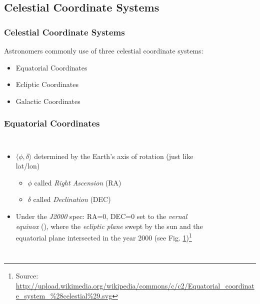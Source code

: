 \subsection{Celestial Coordinate Systems}
\begin{frame}
\frametitle{Celestial Coordinate Systems}
Astronomers commonly use of \alert{three} celestial coordinate systems:
\begin{itemize}
\item Equatorial Coordinates
\item Ecliptic Coordinates
\item Galactic Coordinates
\end{itemize}
\end{frame}
\begin{frame}
\frametitle{Equatorial Coordinates}
\begin{columns}[c]
\begin{itemize}
\item $\langle\phi,\delta\rangle$ determined by the Earth's axis of rotation (just like lat/lon)
	\begin{itemize}
	\item $\phi$ called \emph{Right Ascension} (RA)
	\item $\delta$ called \emph{Declination} (DEC)
	\end{itemize}
\item Under the \emph{J2000} spec: RA=0, DEC=0 set to the \emph{vernal equinox} (\Aries), where the \emph{ecliptic plane} swept by the sun and the equatorial plane intersected in the year 2000 (see Fig. \ref{equatorial-fig})\footnote{Source: \url{http://upload.wikimedia.org/wikipedia/commons/c/c2/Equatorial_coordinate_system_\%28celestial\%29.svg}}
\end{itemize}
\begin{figure}[h]
{\centering
{}
\label{equatorial-fig}
}
\end{figure}

\end{columns}
\end{frame}
